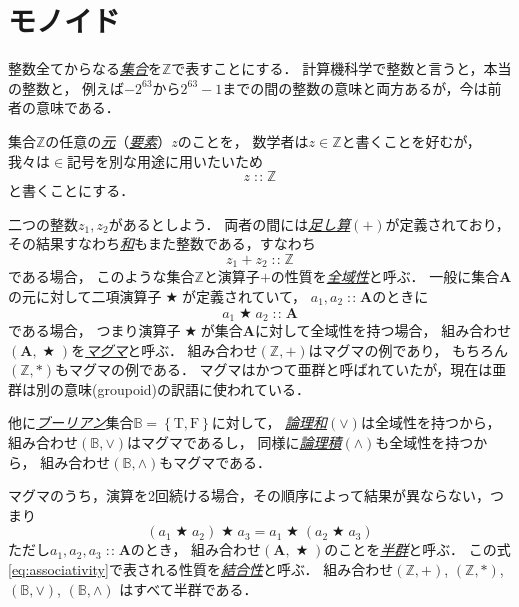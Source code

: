 \documentclass[a5paper,draft]{jsbook}
\newcommand{\keyword}[1]{{\underline{\emph{#1}}}}
\newcommand{\mathConstant}[1]{\mathrm{#1}} %
\newcommand{\mathSet}[1]{\mathbf{#1}} %
\newcommand{\mathSpecialSet}[1]{\mathbb{#1}} %
\newcommand{\mathSetWith}[1]{\left\{#1\right\}}
\newcommand{\mathTupleWith}[1]{\left(#1\right)}
\newcommand{\mathFalse}{\mathConstant{F}}
\newcommand{\mathTrue}{\mathConstant{T}}
\newcommand{\mathBinaryOperator}[1]{\operatorname{#1}}
\newcommand{\mathAnyBinaryOperator}{\mathBinaryOperator{\bigstar}}
\newcommand{\mathIn}{\mathBinaryOperator{:\!:}}
\begin{document}
\section{モノイド}

整数全てからなる\keyword{集合}を$\mathSpecialSet{Z}$で表すことにする．
計算機科学で整数と言うと，本当の整数と，
例えば$-2^{63}$から$2^{63}-1$までの間の整数の意味と両方あるが，今は前者の意味である．

集合$\mathSpecialSet{Z}$の任意の\keyword{元}（\keyword{要素}）$z$のことを，
数学者は$z\in\mathSpecialSet{Z}$と書くことを好むが，
我々は$\in$記号を別な用途に用いたいため
\begin{equation}
\label{eq:totality}
z\mathIn\mathSpecialSet{Z}
\end{equation}
と書くことにする．

二つの整数$z_1,z_2$があるとしよう．
両者の間には\keyword{足し算}$(+)$が定義されており，
その結果すなわち\keyword{和}もまた整数である，すなわち
\begin{equation}
z_1+z_2\mathIn\mathSpecialSet{Z}
\end{equation}
である場合，
このような集合$\mathSpecialSet{Z}$と演算子$+$の性質を\keyword{全域性}と呼ぶ．
一般に集合$\mathSet{A}$の元に対して二項演算子$\mathAnyBinaryOperator$が定義されていて，
$a_1,a_2\mathIn\mathSet{A}$のときに
\begin{equation}
\label{eq:totality}
a_1\mathAnyBinaryOperator a_2\mathIn\mathSet{A}
\end{equation}
である場合，
つまり演算子$\mathAnyBinaryOperator$が集合$\mathSet{A}$に対して全域性を持つ場合，
組み合わせ$\mathTupleWith{\mathSet{A},\mathAnyBinaryOperator}$を\keyword{マグマ}と呼ぶ．
組み合わせ$\mathTupleWith{\mathSpecialSet{Z},+}$はマグマの例であり，
もちろん$\mathTupleWith{\mathSpecialSet{Z},*}$もマグマの例である．
マグマはかつて亜群と呼ばれていたが，現在は亜群は別の意味(groupoid)の訳語に使われている．

他に\keyword{ブーリアン}集合$\mathSpecialSet{B}=\mathSetWith{\mathTrue,\mathFalse}$に対して，
\keyword{論理和}$(\vee)$は全域性を持つから，
組み合わせ$\mathTupleWith{\mathSpecialSet{B},\vee}$はマグマであるし，
同様に\keyword{論理積}$(\wedge)$も全域性を持つから，
組み合わせ$\mathTupleWith{\mathSpecialSet{B},\wedge}$もマグマである．

マグマのうち，演算を2回続ける場合，その順序によって結果が異ならない，つまり
\begin{equation}
\label{eq:associativity}
\left(a_1\mathAnyBinaryOperator a_2\right)\mathAnyBinaryOperator a_3
=a_1\mathAnyBinaryOperator\left(a_2\mathAnyBinaryOperator a_3\right)
\end{equation}
ただし$a_1,a_2,a_3\mathIn\mathSet{A}$のとき，
組み合わせ$\mathTupleWith{\mathSet{A},\mathAnyBinaryOperator}$のことを\keyword{半群}と呼ぶ．
この式\eqref{eq:associativity}で表される性質を\keyword{結合性}と呼ぶ．
組み合わせ$\mathTupleWith{\mathSpecialSet{Z},+}$,
$\mathTupleWith{\mathSpecialSet{Z},*}$,
$\mathTupleWith{\mathSpecialSet{B},\vee}$,
$\mathTupleWith{\mathSpecialSet{B},\wedge}$ はすべて半群である．
\end{document}
